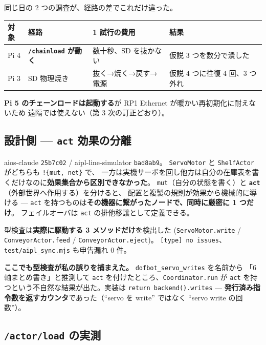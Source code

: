 \documentclass[a4paper,11pt]{ltjsarticle}
\begin{document}
同じ日の 2 つの調査が、経路の差でこれだけ違った。

\begin{center}\small
\begin{tabular}{@{}l l l l@{}}
\toprule
\textbf{対象} & \textbf{経路} & \textbf{1 試行の費用} & \textbf{結果}\\
\midrule
Pi 4 & \textbf{\texttt{/chainload} が動く} & 数十秒、SD を抜かない & 仮説 3 つを数分で潰した\\
Pi 3 & SD 物理焼き & 抜く→焼く→戻す→電源 & 仮説 4 つに往復 4 回、3 つ外れ\\
\bottomrule
\end{tabular}
\end{center}

\textbf{Pi 5 のチェーンロードは起動する}が RP1 Ethernet が暖かい再初期化に耐えないため
遠隔では使えない（第 3 次の訂正どおり）。

\subsection{設計側 --- \texttt{act} 効果の分離}

aios-claude \texttt{25b7c02} / aipl-line-simulator \texttt{bad8ab9}。
\texttt{ServoMotor} と \texttt{ShelfActor} がどちらも \texttt{!\{mut, net\}} で、
一方は実機サーボを回し他方は自分の在庫表を書くだけなのに\textbf{効果集合から区別できなかった}。
\texttt{mut}（自分の状態を書く）と \textbf{\texttt{act}}（外部世界へ作用する）を分けると、
配置と複製の規則が効果から機械的に導ける ---
\texttt{act} を持つものは\textbf{その機器に繋がったノードで、同時に厳密に 1 つだけ}。
フェイルオーバは \texttt{act} の排他移譲として定義できる。

型検査は\textbf{実際に駆動する 3 メソッドだけ}を検出した
(\texttt{ServoMotor.write} / \texttt{ConveyorActor.feed} / \texttt{ConveyorActor.eject})。
\texttt{[type] no issues}、\texttt{test/aipl\_sync.mjs} も申告漏れ 0 件。

\textbf{ここでも型検査が私の誤りを捕まえた。} \texttt{dofbot\_servo\_writes} を名前から
「6 軸まとめ書き」と推測して \texttt{act} を付けたところ、\texttt{Coordinator.run} が
\texttt{act} を持つという不自然な結果が出た。実装は \texttt{return backend().writes} ---
\textbf{発行済み指令数を返すカウンタ}であった（``servo を write'' ではなく
``servo write の回数''）。

\subsection{\texttt{/actor/load} の実測}
\end{document}

